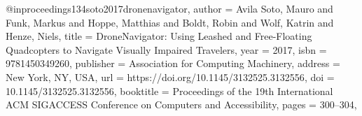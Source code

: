 @inproceedings{134soto2017dronenavigator,
author = {Avila Soto, Mauro and Funk, Markus and Hoppe, Matthias and Boldt, Robin and Wolf, Katrin and Henze, Niels},
title = {DroneNavigator: Using Leashed and Free-Floating Quadcopters to Navigate Visually Impaired Travelers},
year = {2017},
isbn = {9781450349260},
publisher = {Association for Computing Machinery},
address = {New York, NY, USA},
url = {https://doi.org/10.1145/3132525.3132556},
doi = {10.1145/3132525.3132556},
booktitle = {Proceedings of the 19th International ACM SIGACCESS Conference on Computers and Accessibility},
pages = {300–304},
}